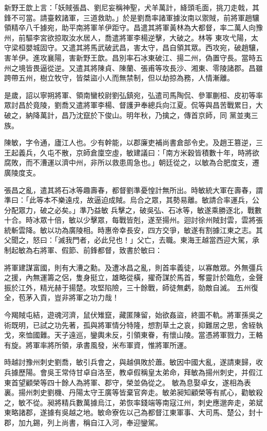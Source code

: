 \begin{pinyinscope}
 新野王歆上言：「妖賊張昌、劉尼妄稱神聖，犬羊萬計，絳頭毛面，挑刀走戟，其鋒不可當。請臺敕諸軍，三道救助。」於是劉喬率諸軍據汝南以禦賊，前將軍趙驤領精卒八千據宛，助平南將軍羊伊距守。昌遣其將軍黃林為大都督，率二萬人向豫州，前驅李宮欲掠取汝水居人，喬遣將軍李楊逆擊，大破之。林等
 東攻弋陽，太守梁桓嬰城固守。又遣其將馬武破武昌，害太守，昌自領其眾。西攻宛，破趙驤，害羊伊。進攻襄陽，害新野王歆。昌別率石冰東破江、揚二州，偽置守長。當時五州之境皆畏逼從逆。又遣其將陳貞、陳蘭、張甫等攻長沙、湘東、零陵諸郡。昌雖跨帶五州，樹立牧守，皆桀盜小人而無禁制，但以劫掠為務，人情漸離。



 是歲，詔以寧朔將軍、領南蠻校尉劉弘鎮宛，弘遣司馬陶侃、參軍蒯桓、皮初等率眾討昌於竟陵，劉喬又遣將軍李楊、督護尹奉總兵向江夏。侃等與昌苦戰累日，大破之，納降萬計，昌乃沈竄於下俊山。明年秋，乃擒之，傳首京師，同
 黨並夷三族。



 陳敏，字令通，廬江人也。少有幹能，以郡廉吏補尚書倉部令史。及趙王篡逆，三王起義兵，久屯不散，京師倉廩空虛，敏建議曰：「南方米穀皆積數十年，時將欲腐敗，而不漕運以濟中州，非所以救患周急也。」朝廷從之，以敏為合肥度支，遷廣陵度支。



 張昌之亂，遣其將石冰等趣壽春，都督劉準憂惶計無所出。時敏統大軍在壽春，謂準曰：「此等本不樂遠戍，故逼迫成賊。烏合之眾，其勢易離。敏請合率運兵，公分配眾力，破之必矣。」準乃益敏
 兵擊之，破吳弘、石冰等，敏遂乘勝逐北，戰數十合。時冰眾十倍，敏以少擊眾，每戰皆剋，遂至揚州。迴討徐州賊封雲，雲將張統斬雲降。敏以功為廣陵相。時惠帝幸長安，四方交爭，敏遂有割據江東之志。其父聞之，怒曰：「滅我門者，必此兒也！」父亡，去職。東海王越當西迎大駕，承制起敏為右將軍、假節、前鋒都督，致書於敏曰：



 將軍建謀富國，則有大漕之勳。及遭冰昌之亂，則首率義徒，以寡敵眾。外無彊兵之援，內無運籌之侶，隻身挺立，雄略從橫，擢奇謀於馬首，奪靈計於臨危，金聲振於江外，精光赫于揚楚。攻堅陷險，三十餘戰，師徒無虧，勍敵自滅。
 五州復全，苞茅入貢，豈非將軍之功力哉！



 今羯賊屯結，遊魂河濟，鼠伏雉竄，藏匿陳留，始欲姦盜，終圖不軌。將軍孫吳之術既明，已試之功先著，孤與將軍情分特隆，想割草土之哀，抑難居之思，舍絰執戈，來恤國難。天子遠巡，鑾輿未反，引領東眷，有懷山陵。當憑將軍戮力，王輅有旋。將軍率將所領，承書風發，米布軍資，惟將軍所運。



 時越討豫州刺史劉喬，敏引兵會之，與越俱敗於蕭。敏因中國大亂，遂請東歸，收兵據歷陽。會吳王常侍甘卓自洛至，教卓假稱皇太弟命，拜敏為揚州刺史，并假江東首望顧榮等四十餘人為將軍、郡守，榮並偽從之。
 敏為息娶卓女，遂相為表裏。揚州刺史劉機、丹陽太守王廣等皆棄官奔走。敏弟昶知顧榮等有貳心，勸敏殺之，敏不從。昶將精兵數萬據烏江，弟恢率錢端等南寇江州，刺史應邈奔走，弟斌東略諸郡，遂據有吳越之地。敏命寮佐以己為都督江東軍事、大司馬、楚公，封十郡，加九錫，列上尚書，稱自江入河，奉迎鑾駕。




\end{pinyinscope}

